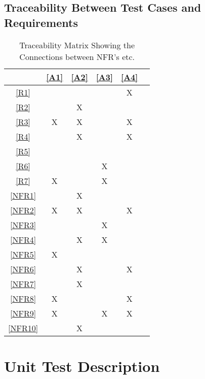 \documentclass[12pt, titlepage]{article}
\begin{document}
\subsection{Traceability Between Test Cases and Requirements}


\noindent
\begin{table}[h!]
\centering
\begin{tabular}{|c|c|c|c|c|c}
\hline
	& \ref{A1}& \ref{A2}& \ref{A3}& \ref{A4} \\
\hline          %
\ref{R1}       &   &   &   & X  \\ \hline
\ref{R2}       &   & X&   &    \\ \hline
\ref{R3}       & X& X&   & X  \\ \hline
\ref{R4}       &   & X&   & X  \\ \hline
\ref{R5}       &   &   &   &    \\ \hline
\ref{R6}       &   &   & X&    \\ \hline
\ref{R7}       & X&   & X&     \\ \hline
\ref{NFR1} &   & X&   &    \\ \hline
\ref{NFR2} & X& X&   & X \\ \hline
\ref{NFR3} &   &   & X&     \\ \hline
\ref{NFR4} &   & X& X&     \\ \hline
\ref{NFR5} &   X&   &   &      \\ \hline
\ref{NFR6} &   &  X &   &X     \\ \hline
\ref{NFR7} &   &  X &   &     \\ \hline
\ref{NFR8} &  X &   &   &X     \\ \hline
\ref{NFR9} & X  &   &X  &X      \\ \hline
\ref{NFR10}&  & X  &   &      \\
\hline
\end{tabular}
\caption{Traceability Matrix Showing the Connections between NFR's etc.}
\label{Table:A_trace}
\end{table}

\newpage
\section{Unit Test Description}

\end{document}
